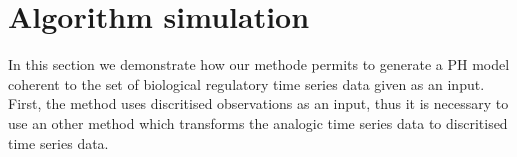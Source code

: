 
\section{Algorithm simulation}
\label{algo_but}

In this section we demonstrate how our methode permits to generate a PH model coherent to the set of biological regulatory time series data given as an input. 
First, the method uses discritised observations as an input, thus it is necessary to use an other method which transforms the analogic time series data to discritised time series data.




